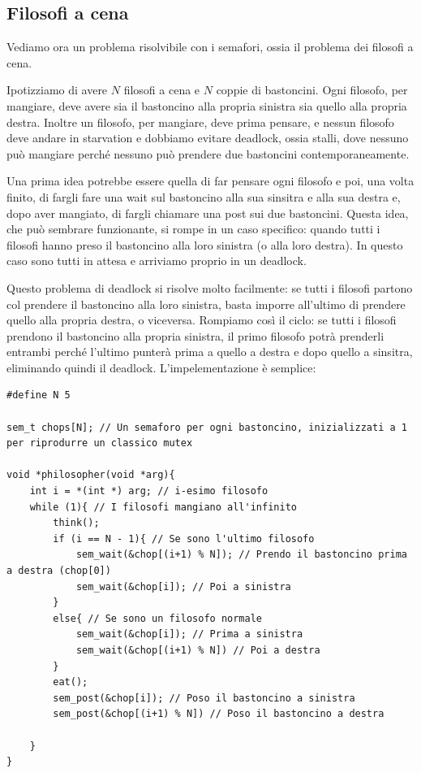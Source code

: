 \documentclass[11pt, a4paper, titlepage, oneside]{scrbook}
\begin{document}
\subsection{Filosofi a cena}

Vediamo ora un problema risolvibile con i semafori, ossia il problema dei filosofi a cena.

Ipotizziamo di avere $N$ filosofi a cena e $N$ coppie di bastoncini. Ogni filosofo, per mangiare, deve avere sia il bastoncino alla propria sinistra sia quello alla propria destra. Inoltre un filosofo, per mangiare, deve prima pensare, e nessun filosofo deve andare in starvation e dobbiamo evitare deadlock, ossia stalli, dove nessuno può mangiare perché nessuno può prendere due bastoncini contemporaneamente.

Una prima idea potrebbe essere quella di far pensare ogni filosofo e poi, una volta finito, di fargli fare una wait sul bastoncino alla sua sinsitra e alla sua destra e, dopo aver mangiato, di fargli chiamare una post sui due bastoncini. Questa idea, che può sembrare funzionante, si rompe in un caso specifico: quando tutti i filosofi hanno preso il bastoncino alla loro sinistra (o alla loro destra). In questo caso sono tutti in attesa e arriviamo proprio in un deadlock.

Questo problema di deadlock si risolve molto facilmente: se tutti i filosofi partono col prendere il bastoncino alla loro sinistra, basta imporre all'ultimo di prendere quello alla propria destra, o viceversa. Rompiamo così il ciclo: se tutti i filosofi prendono il bastoncino alla propria sinistra, il primo filosofo potrà prenderli entrambi perché l'ultimo punterà prima a quello a destra e dopo quello a sinsitra, eliminando quindi il deadlock. L'impelementazione è semplice:

\begin{lstlisting}[style=C]
#define N 5

sem_t chops[N]; // Un semaforo per ogni bastoncino, inizializzati a 1 per riprodurre un classico mutex

void *philosopher(void *arg){
    int i = *(int *) arg; // i-esimo filosofo
    while (1){ // I filosofi mangiano all'infinito
        think();
        if (i == N - 1){ // Se sono l'ultimo filosofo
            sem_wait(&chop[(i+1) % N]); // Prendo il bastoncino prima a destra (chop[0])
            sem_wait(&chop[i]); // Poi a sinistra
        }
        else{ // Se sono un filosofo normale
            sem_wait(&chop[i]); // Prima a sinistra
            sem_wait(&chop[(i+1) % N]) // Poi a destra
        }
        eat();
        sem_post(&chop[i]); // Poso il bastoncino a sinistra
        sem_post(&chop[(i+1) % N]) // Poso il bastoncino a destra
    
    }
}
\end{lstlisting}
\end{document}
